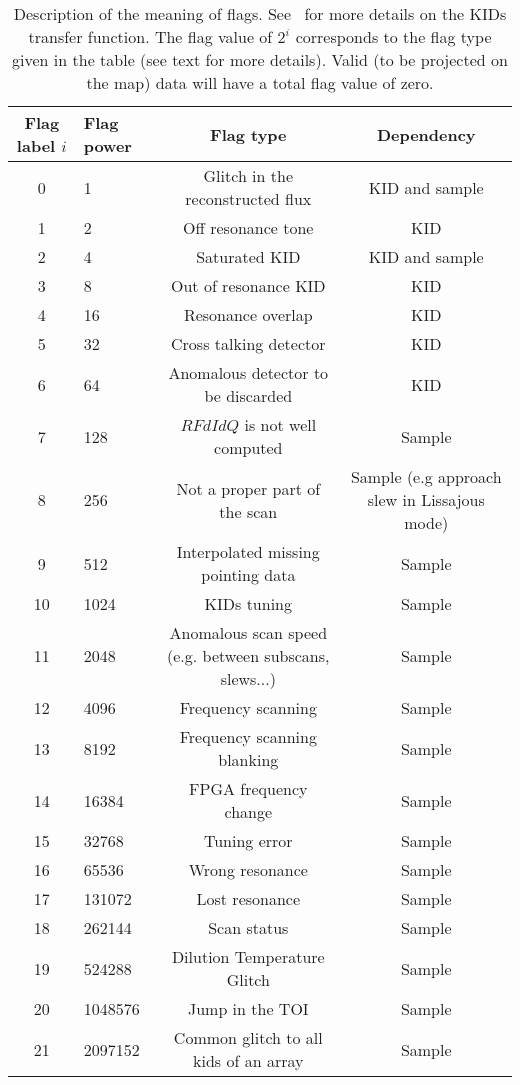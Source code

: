 \documentclass[a4paper,10pt]{article}
\begin{document}
	\begin{table}[ht]
	\begin{center}
	\begin{tabular}{|c|l|c|c|}
	 \hline
	Flag label $i$ & Flag power  & Flag type & Dependency \\
	\hline
	0 & 1 & Glitch in the reconstructed flux & KID and sample\\
	1 & 2 & Off resonance tone & KID \\
	2 & 4 & Saturated KID &  KID and sample \\
	3 & 8 & Out of resonance KID & KID \\
	4 & 16 & Resonance overlap &  KID \\
	5 & 32 & Cross talking detector & KID \\
	6 & 64 & Anomalous detector to be discarded & KID \\
	7 & 128 & $RFdIdQ$ is not well computed & Sample \\
	8 & 256 & Not a proper part of the scan & Sample (e.g approach slew in
        Lissajous mode) \\
	9 & 512 & Interpolated missing pointing data & Sample \\
	10 & 1024 & KIDs tuning & Sample \\
	11 & 2048 & Anomalous scan speed (e.g. between subscans, slews...)& Sample \\
	12 & 4096 &  Frequency scanning & Sample \\
	13 &  8192&  Frequency scanning blanking & Sample \\
	14 & 16384 & FPGA frequency change & Sample \\
	15 & 32768 & Tuning error & Sample \\
	16 & 65536 &  Wrong resonance & Sample \\
	17 & 131072 &  Lost resonance & Sample \\
	18 & 262144 &  Scan status  & Sample \\
	19 & 524288 &  Dilution Temperature Glitch  & Sample \\
	20 & 1048576 &  Jump in the TOI  & Sample \\
        21 & 2097152 & Common glitch to all kids of an array & Sample\\
	
	\hline
	\end{tabular}
	\end{center}
	\caption{Description of the meaning of flags. See~\cite{calvo_2012} for
          more details on the KIDs transfer function. The flag value of $2^i$
          corresponds to the flag type given in the table (see text for more
          details). Valid (to be projected on the map) data will have a total
          flag value of zero.}
	\label{tab:table_flag}
	\end{table}	
		
\end{document}

